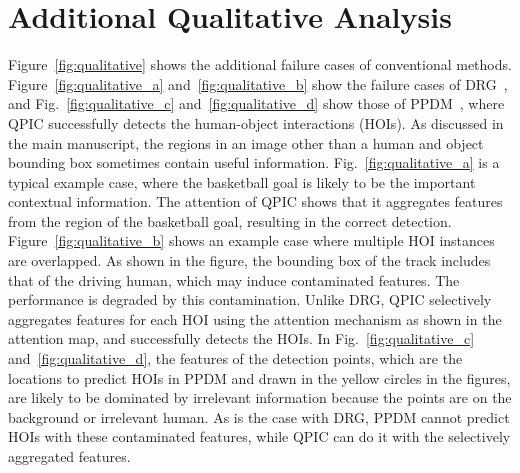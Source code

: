 \documentclass[final]{cvpr}
\begin{document}
\section{Additional Qualitative Analysis}
Figure~\ref{fig:qualitative} shows the additional failure cases of conventional methods. Figure~\ref{fig:qualitative_a} and~\ref{fig:qualitative_b} show the failure cases of DRG~\cite{gao_eccv2020}, and Fig.~\ref{fig:qualitative_c} and~\ref{fig:qualitative_d} show those of PPDM~\cite{liao_cvpr2020}, where QPIC successfully detects the human-object interactions (HOIs).
As discussed in the main manuscript, the regions in an image other than a human and object bounding box sometimes contain useful information. Fig.~\ref{fig:qualitative_a} is a typical example case, where the basketball goal is likely to be the important contextual information. The attention of QPIC shows that it aggregates features from the region of the basketball goal, resulting in the correct detection.
Figure~\ref{fig:qualitative_b} shows an example case where multiple HOI instances are overlapped. As shown in the figure, the bounding box of the track includes that of the driving human, which may induce contaminated features. The performance is degraded by this contamination. Unlike DRG, QPIC selectively aggregates features for each HOI using the attention mechanism as shown in the attention map, and successfully detects the HOIs.
In Fig.~\ref{fig:qualitative_c} and~\ref{fig:qualitative_d}, the features of the detection points, which are the locations to predict HOIs in PPDM and drawn in the yellow circles in the figures, are likely to be dominated by irrelevant information because the points are on the background or irrelevant human. As is the case with DRG, PPDM cannot predict HOIs with these contaminated features, while QPIC can do it with the selectively aggregated features.
\end{document}
